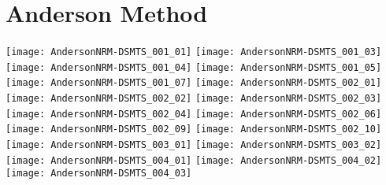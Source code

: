 \documentclass[notitlepage]{revtex4-1}
\begin{document}
\section{Anderson Method}
\texttt{[image: AndersonNRM-DSMTS\_001\_01]}
\texttt{[image: AndersonNRM-DSMTS\_001\_03]}
\texttt{[image: AndersonNRM-DSMTS\_001\_04]}
\texttt{[image: AndersonNRM-DSMTS\_001\_05]}
\texttt{[image: AndersonNRM-DSMTS\_001\_07]}
\texttt{[image: AndersonNRM-DSMTS\_002\_01]}
\texttt{[image: AndersonNRM-DSMTS\_002\_02]}
\texttt{[image: AndersonNRM-DSMTS\_002\_03]}
\texttt{[image: AndersonNRM-DSMTS\_002\_04]}
\texttt{[image: AndersonNRM-DSMTS\_002\_06]}
\texttt{[image: AndersonNRM-DSMTS\_002\_09]}
\texttt{[image: AndersonNRM-DSMTS\_002\_10]}
\texttt{[image: AndersonNRM-DSMTS\_003\_01]}
\texttt{[image: AndersonNRM-DSMTS\_003\_02]}
\texttt{[image: AndersonNRM-DSMTS\_004\_01]}
\texttt{[image: AndersonNRM-DSMTS\_004\_02]}
\texttt{[image: AndersonNRM-DSMTS\_004\_03]}
\end{document}
